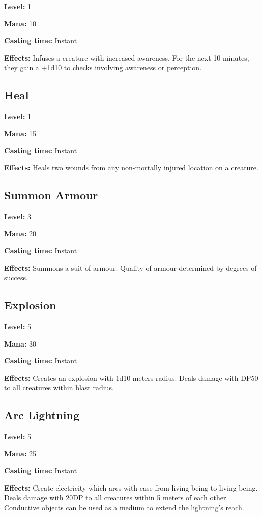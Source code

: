 \documentclass[]{article}
\begin{document}
\textbf{Level:} 1

\textbf{Mana:} 10

\textbf{Casting time:} Instant

\textbf{Effects:} Infuses a creature with increased awareness. For the
next 10 minutes, they gain a +1d10 to checks involving awareness or
perception.

\subsection{Heal}\label{heal}

\textbf{Level:} 1

\textbf{Mana:} 15

\textbf{Casting time:} Instant

\textbf{Effects:} Heals two wounds from any non-mortally injured
location on a creature.

\subsection{Summon Armour}\label{summon-armour}

\textbf{Level:} 3

\textbf{Mana:} 20

\textbf{Casting time:} Instant

\textbf{Effects:} Summons a suit of armour. Quality of armour determined
by degrees of success.

\subsection{Explosion}\label{explosion}

\textbf{Level:} 5

\textbf{Mana:} 30

\textbf{Casting time:} Instant

\textbf{Effects:} Creates an explosion with 1d10 meters radius. Deals
damage with DP50 to all creatures within blast radius.

\subsection{Arc Lightning}\label{arc-lightning}

\textbf{Level:} 5

\textbf{Mana:} 25

\textbf{Casting time:} Instant

\textbf{Effects:} Create electricity which arcs with ease from living
being to living being. Deals damage with 20DP to all creatures within 5
meters of each other. Conductive objects can be used as a medium to
extend the lightning's reach.
\end{document}
